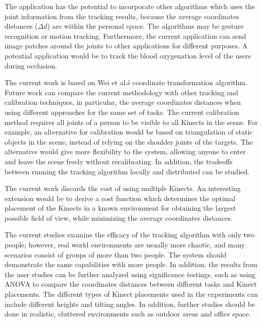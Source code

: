 The application has the potential to incorporate other algorithms which uses the joint information from the tracking results, because the average coordinates distances ($\Delta d$) are within the personal space. The algorithms may be gesture recognition or motion tracking. Furthermore, the current application can send image patches around the joints to other applications for different purposes. A potential application would be to track the blood oxygenation level of the users during occlusion.

The current work is based on Wei et al.\'s coordinate transformation algorithm. Future work can compare the current methodology with other tracking and calibration techniques, in particular, the average coordinates distances when using different approaches for the same set of tasks. The current calibration method requires all joints of a person to be visible to all Kinects in the scene. For example, an alternative for calibration would be based on triangulation of static objects in the scene, instead of relying on the shoulder joints of the targets. The alternative would give more flexibility to the system, allowing anyone to enter and leave the scene freely without recalibrating. In addition, the tradeoffs between running the tracking algorithm locally and distributed can be studied.

The current work discards the cost of using multiple Kinects. An interesting extension would be to derive a cost function which determines the optimal placement of the Kinects in a known environment for obtaining the largest possible field of view, while minimizing the average coordinates distances.

The current studies examine the efficacy of the tracking algorithm with only two people; however, real world environments are usually more chaotic, and many scenarios consist of groups of more than two people. The system should demonstrate the same capabilities with more people. In addition, the results from the user studies can be further analyzed using significance testings, such as using ANOVA to compare the coordinates distances between different tasks and Kinect placements. The different types of Kinect placements used in the experiments can include different heights and tilting angles. In addition, further studies should be done in realistic, cluttered environments such as outdoor areas and office space.


